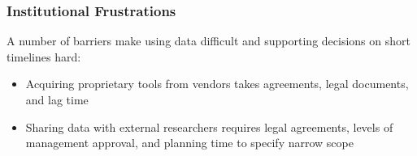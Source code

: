 \documentclass{beamer}
\begin{document}
{
\begin{frame}[plain]
\end{frame}
}

\begin{frame}
\frametitle{Institutional Frustrations}
A number of barriers make using data difficult and supporting decisions on short timelines hard:
  \begin{itemize}
  \item Acquiring proprietary tools from vendors takes agreements, legal documents, and lag time
  \pause
  \item Sharing data with external researchers requires legal agreements, levels of management approval, and planning time to specify narrow scope
  \end {itemize}
\end{frame}

{
\begin{frame}[plain]
\end{frame}
}
\end{document}

